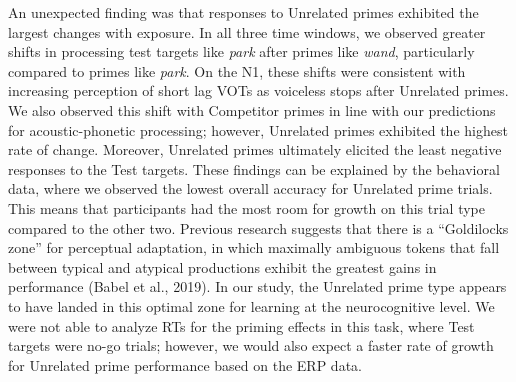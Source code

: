 \documentclass[
  12pt,
  twoside]{article}
\begin{document}
An unexpected finding was that responses to Unrelated primes exhibited the largest changes with exposure.
In all three time windows, we observed greater shifts in processing test targets like \emph{park} after primes like \emph{wand}, particularly compared to primes like \emph{park}.
On the N1, these shifts were consistent with increasing perception of short lag VOTs as voiceless stops after Unrelated primes.
We also observed this shift with Competitor primes in line with our predictions for acoustic-phonetic processing; however, Unrelated primes exhibited the highest rate of change.
Moreover, Unrelated primes ultimately elicited the least negative responses to the Test targets.
These findings can be explained by the behavioral data, where we observed the lowest overall accuracy for Unrelated prime trials.
This means that participants had the most room for growth on this trial type compared to the other two.
Previous research suggests that there is a ``Goldilocks zone'' for perceptual adaptation, in which maximally ambiguous tokens that fall between typical and atypical productions exhibit the greatest gains in performance (Babel et al., 2019).
In our study, the Unrelated prime type appears to have landed in this optimal zone for learning at the neurocognitive level.
We were not able to analyze RTs for the priming effects in this task, where Test targets were no-go trials; however, we would also expect a faster rate of growth for Unrelated prime performance based on the ERP data.
\end{document}
